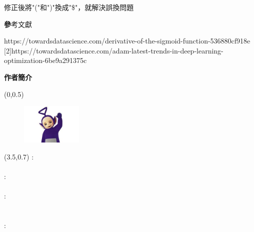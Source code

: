 \documentclass[14pt,a4paper]{report}  %
\begin{document}
修正後將"("和")"換成"\$"，就解決誤換問題
\newpage
\begin{center}
\LARGE\textbf 參考文獻\\
\end{center}
\begin{flushleft}
\begin{Large}
[1]\quad https://towardsdatascience.com/derivative-of-the-sigmoid-function-536880cf918e\\

[2]\quad https://towardsdatascience.com/adam-latest-trends-in-deep-learning-optimization-6be9a291375c\\
\end{Large}
\end{flushleft}
\newpage
    \begin{center}
	\fontsize{20pt}{0em}\selectfont \bf{作者簡介}\\
	\end{center}
	
	{\begin{textblock}{6}(0,0.5)
	\begin{figure}
	\includegraphics[width=1.15in]{40723110.jpg} 
	\end{figure}
	\end{textblock}}
	{\renewcommand\baselinestretch{0.99}\selectfont %
	{\begin{textblock}{15}(3.5,0.7)%
	\noindent\fontsize{14pt}{0em}\selectfont {}\enspace:\enspace
    \fontsize{14pt}{0em}\selectfont {}\\     \hspace*{\fill} \\
    \fontsize{14pt}{0em}\selectfont {}\enspace:\enspace
    \fontsize{14pt}{0em}\selectfont {} \\ %
    \hspace*{\fill} \\
    \fontsize{14pt}{0em}\selectfont {}\enspace:\enspace
    \fontsize{14pt}{0em}\selectfont {}\\
    \fontsize{14pt}{0em}\selectfont \makebox[5em][s]{\quad}\enspace\enspace
    \fontsize{14pt}{0em}\selectfont {}\\
    \hspace*{\fill} \\
    \fontsize{14pt}{0em}\selectfont {}\enspace:\enspace
    \end{textblock}}}
    \hspace*{\fill} \\
\end{document}
